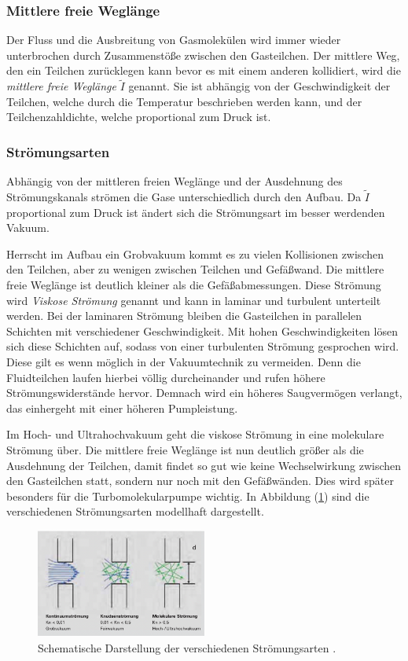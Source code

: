 \subsubsection{Mittlere freie Weglänge}
Der Fluss und die Ausbreitung von Gasmolekülen wird immer wieder unterbrochen durch Zusammenstöße zwischen den Gasteilchen.
Der mittlere Weg, 
den ein Teilchen zurücklegen kann bevor es mit einem anderen kollidiert, wird die \textit{mittlere freie Weglänge} $\tilde{I}$ genannt.
Sie ist abhängig von der Geschwindigkeit der Teilchen, welche durch die Temperatur beschrieben werden kann,
und der Teilchenzahldichte, welche proportional zum Druck ist.  

\subsubsection{Strömungsarten}
Abhängig von der mittleren freien Weglänge
und der Ausdehnung des Strömungskanals strömen die Gase unterschiedlich durch den Aufbau.
Da $\tilde{I}$ proportional zum Druck ist ändert sich die Strömungsart im besser werdenden Vakuum.

Herrscht im Aufbau ein Grobvakuum kommt es zu vielen Kollisionen zwischen den Teilchen,
aber zu wenigen zwischen Teilchen und Gefäßwand.
Die mittlere freie Weglänge ist deutlich kleiner als die Gefäßabmessungen.
Diese Strömung wird \textit{Viskose Strömung} genannt 
und kann in laminar und turbulent unterteilt werden.
Bei der laminaren Strömung bleiben die Gasteilchen in parallelen Schichten mit verschiedener Geschwindigkeit.
Mit hohen Geschwindigkeiten lösen sich diese Schichten auf, 
sodass von einer turbulenten Strömung gesprochen wird. 
Diese gilt es wenn möglich in der Vakuumtechnik zu vermeiden.
Denn die Fluidteilchen laufen hierbei völlig durcheinander und rufen höhere Strömungswiderstände hervor.
Demnach wird ein höheres Saugvermögen verlangt, das einhergeht mit einer höheren Pumpleistung.

Im Hoch- und Ultrahochvakuum geht die viskose Strömung in eine molekulare Strömung über.
Die mittlere freie Weglänge ist nun deutlich größer als die Ausdehnung der Teilchen,
damit findet so gut wie keine Wechselwirkung zwischen den Gasteilchen statt,
sondern nur noch mit den Gefäßwänden.
Dies wird später besonders für die Turbomolekularpumpe wichtig.
In Abbildung (\ref{fig:strömung}) sind die verschiedenen Strömungsarten modellhaft dargestellt.
\begin{figure}[h]
    \centering
    \includegraphics[width=0.5\textwidth]{abb/Stroemungen.png}
    \caption{Schematische Darstellung der verschiedenen Strömungsarten \cite{Pfeifer}.}
    \label{fig:strömung}
\end{figure}

